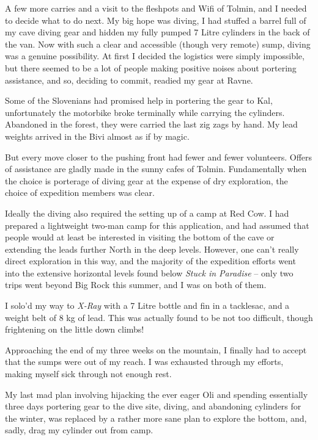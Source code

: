 A few more carries and a visit to the fleshpots and Wifi of Tolmin, and
I needed to decide what to do next. My big hope was diving, I had
stuffed a barrel full of my cave diving gear and hidden my fully pumped
7 Litre cylinders in the back of the van. Now with such a clear and
accessible (though very remote) sump, diving was a genuine possibility.
At first I decided the logistics were simply impossible, but there
seemed to be a lot of people making positive noises about portering
assistance, and so, deciding to commit, readied my gear at Ravne.

Some of the Slovenians had promised help in portering the gear to Kal,
unfortunately the motorbike broke terminally while carrying the
cylinders. Abandoned in the forest, they were carried the last zig zags
by hand. My lead weights arrived in the Bivi almost as if by magic.

But every move closer to the pushing front had fewer and fewer
volunteers. Offers of assistance are gladly made in the sunny cafes of
Tolmin. Fundamentally when the choice is porterage of diving gear at the
expense of dry exploration, the choice of expedition members was clear.

Ideally the diving also required the setting up of a camp at Red Cow. I
had prepared a lightweight two-man camp for this application, and had
assumed that people would at least be interested in visiting the bottom
of the cave or extending the leads further North in the deep levels.
However, one can't really direct exploration in this way, and the
majority of the expedition efforts went into the extensive horizontal
levels found below \emph{Stuck in Paradise} -- only two trips went
beyond Big Rock this summer, and I was on both of them.

I solo'd my way to \emph{X-Ray} with a 7 Litre bottle and fin in a
tacklesac, and a weight belt of 8 kg of lead. This was actually found to
be not too difficult, though frightening on the little down climbs!

Approaching the end of my three weeks on the mountain, I finally had to
accept that the sumps were out of my reach. I was exhausted through my
efforts, making myself sick through not enough rest.

My last mad plan involving hijacking the ever eager Oli and spending
essentially three days portering gear to the dive site, diving, and
abandoning cylinders for the winter, was replaced by a rather more sane
plan to explore the bottom, and, sadly, drag my cylinder out from camp.

